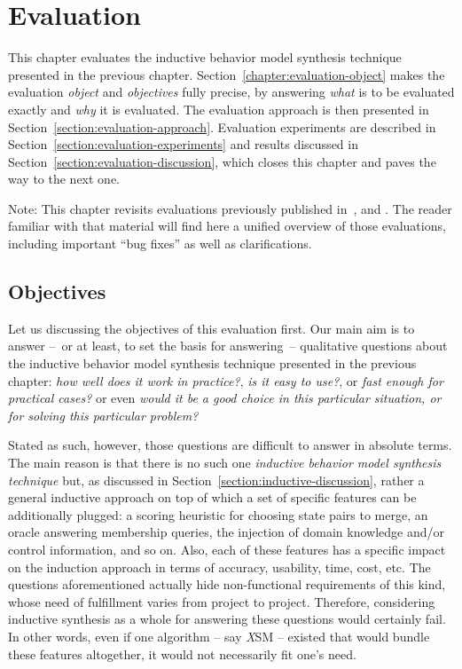 \chapter{Evaluation\label{chapter:evaluation}}

This chapter evaluates the inductive behavior model synthesis technique presented in the previous chapter. Section~\ref{chapter:evaluation-object} makes the evaluation \emph{object} and \emph{objectives} fully precise, by answering \emph{what} is to be evaluated exactly and \emph{why} it is evaluated. The evaluation approach is then presented in Section~\ref{section:evaluation-approach}. Evaluation experiments are described in Section~\ref{section:evaluation-experiments} and results discussed in Section~\ref{section:evaluation-discussion}, which closes this chapter and paves the way to the next one.

Note: This chapter revisits evaluations previously published in~\cite{Damas:2006}, \cite{Dupont:2008} and \cite{Lambeau:2008}. The reader familiar with that material will find here a unified overview of those evaluations, including important ``bug fixes'' as well as clarifications.

\section{Objectives\label{chapter:evaluation-object}}

Let us discussing the objectives of this evaluation first. Our main aim is to answer --~or at least, to set the basis for answering~-- qualitative questions about the inductive behavior model synthesis technique presented in the previous chapter: \emph{how well does it work in practice?}, \emph{is it easy to use?}, or \emph{fast enough for practical cases?} or even \emph{would it be a good choice in this particular situation, or for solving this particular problem?}

Stated as such, however, those questions are difficult to answer in absolute terms. The main reason is that there is no such one \emph{inductive behavior model synthesis technique} but, as discussed in Section~\ref{section:inductive-discussion}, rather a general inductive approach on top of which a set of specific features can be additionally plugged: a scoring heuristic for choosing state pairs to merge, an oracle answering membership queries, the injection of domain knowledge and/or control information, and so on. Also, each of these features has a specific impact on the induction approach in terms of accuracy, usability, time, cost, etc. The questions aforementioned actually hide non-functional requirements of this kind, whose need of fulfillment varies from project to project. Therefore, considering inductive synthesis as a whole for answering these questions would certainly fail. In other words, even if one algorithm -- say \emph{X}SM -- existed that would bundle these features altogether, it would not necessarily fit one's need.

